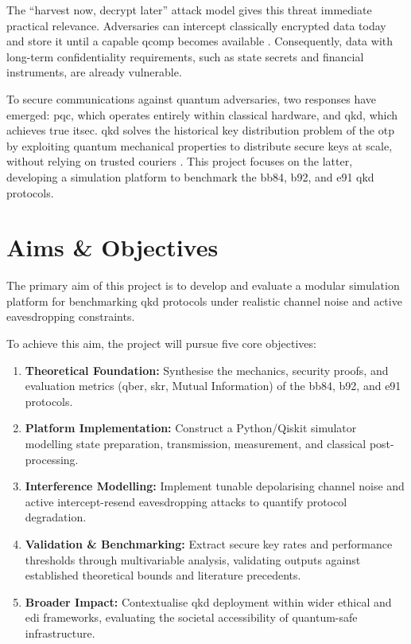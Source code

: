 \documentclass[11pt, a4paper]{report}
\begin{document}
The ``harvest now, decrypt later'' attack model gives this threat immediate practical relevance. Adversaries can intercept classically encrypted data today and store it until a capable \gls{qcomp} becomes available \cite{NIST}. Consequently, data with long-term confidentiality requirements, such as state secrets and financial instruments, are already vulnerable.

To secure communications against quantum adversaries, two responses have emerged: \gls{pqc}, which operates entirely within classical hardware, and \gls{qkd}, which achieves true \gls{itsec}. \Gls{qkd} solves the historical key distribution problem of the \gls{otp} by exploiting quantum mechanical properties to distribute secure keys at scale, without relying on trusted couriers \cite{QKDbible}. This project focuses on the latter, developing a simulation platform to benchmark the \gls{bb84}, \gls{b92}, and \gls{e91} \gls{qkd} protocols.

\newpage
\section{Aims \& Objectives}

The primary aim of this project is to develop and evaluate a modular simulation platform for benchmarking \gls{qkd} protocols under realistic channel noise and active eavesdropping constraints. 

To achieve this aim, the project will pursue five core objectives:
\begin{enumerate}[label=\textbf{O\arabic*}, leftmargin=1.5cm]
    \item \textbf{Theoretical Foundation:} Synthesise the mechanics, security proofs, and evaluation metrics (\gls{qber}, \gls{skr}, Mutual Information) of the \gls{bb84}, \gls{b92}, and \gls{e91} protocols.
    \item \textbf{Platform Implementation:} Construct a Python/Qiskit simulator modelling state preparation, transmission, measurement, and classical post-processing.
    \item \textbf{Interference Modelling:} Implement tunable depolarising channel noise and active intercept-resend eavesdropping attacks to quantify protocol degradation.
    \item \textbf{Validation \& Benchmarking:} Extract secure key rates and performance thresholds through multivariable analysis, validating outputs against established theoretical bounds and literature precedents.
    \item \textbf{Broader Impact:} Contextualise \gls{qkd} deployment within wider ethical and \gls{edi} frameworks, evaluating the societal accessibility of quantum-safe infrastructure.
\end{enumerate}
\end{document}
